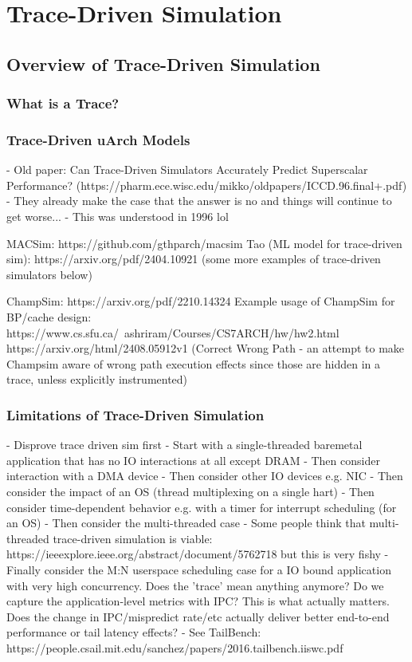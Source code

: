 \setchapterpreamble[u]{\margintoc}
\chapter{Trace-Driven Simulation}

\section{Overview of Trace-Driven Simulation}

\subsection{What is a Trace?}

\subsection{Trace-Driven uArch Models}

- Old paper: Can Trace-Driven Simulators Accurately Predict Superscalar Performance? (https://pharm.ece.wisc.edu/mikko/oldpapers/ICCD.96.final+.pdf)
  - They already make the case that the answer is no and things will continue to get worse...
  - This was understood in 1996 lol

MACSim: https://github.com/gthparch/macsim
Tao (ML model for trace-driven sim): https://arxiv.org/pdf/2404.10921 (some more examples of trace-driven simulators below)

ChampSim: https://arxiv.org/pdf/2210.14324
  Example usage of ChampSim for BP/cache design: https://www.cs.sfu.ca/~ashriram/Courses/CS7ARCH/hw/hw2.html
  https://arxiv.org/html/2408.05912v1 (Correct Wrong Path - an attempt to make Champsim aware of wrong path execution effects since those are hidden in a trace, unless explicitly instrumented)

\subsection{Limitations of Trace-Driven Simulation}

- Disprove trace driven sim first
  - Start with a single-threaded baremetal application that has no IO interactions at all except DRAM
  - Then consider interaction with a DMA device
  - Then consider other IO devices e.g. NIC
  - Then consider the impact of an OS (thread multiplexing on a single hart)
  - Then consider time-dependent behavior e.g. with a timer for interrupt scheduling (for an OS)
  - Then consider the multi-threaded case
    - Some people think that multi-threaded trace-driven simulation is viable: https://ieeexplore.ieee.org/abstract/document/5762718 but this is very fishy
  - Finally consider the M:N userspace scheduling case for a IO bound application with very high concurrency. Does the 'trace' mean anything anymore? Do we capture the application-level metrics with IPC? This is what actually matters. Does the change in IPC/mispredict rate/etc actually deliver better end-to-end performance or tail latency effects?
    - See TailBench: https://people.csail.mit.edu/sanchez/papers/2016.tailbench.iiswc.pdf


